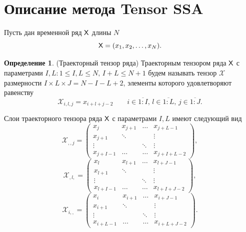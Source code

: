\documentclass[specialist,
    substylefile = spbu_report.rtx,
    subf,href,colorlinks=true, 12pt]{disser}
\theoremstyle{plain}
\theoremstyle{definition}
\newtheorem{definition}{Определение}[section]
\theoremstyle{remark}
\begin{document}
    \section{Описание метода Tensor SSA}\label{sec:Tensor SSA-method-description}
    Пусть дан временной ряд $\mathsf{X}$ длины $N$
    \[
        \mathsf{X}=(x_1,x_2,\ldots,x_N).
    \]
    \begin{definition}(Траекторный тензор ряда)
        Траекторным тензором ряда $\mathsf{X}$ с параметрами $I,L: 1\leqslant I,L \leqslant N,\, I + L \leqslant N + 1$
        будем называть тензор $\mathcal{X}$ размерности $I\times L \times J=N-I-L+2$, элементы которого удовлетворяют равенству
        \[
            \mathcal{X}_{i,l,j}=x_{i+l+j-2}\qquad i\in \overline{1:I},\, l \in\overline{1:L},\, j \in\overline{1:J}.
        \]
    \end{definition}
    Слои траекторного тензора ряда $\mathsf{X}$ с параметрами $I, L$ имеют следующий вид
    \[
        \mathcal{X}_{,,j}=
        \begin{pmatrix}
            x_j       & x_{j+1} & \ldots & x_{j+L-1}   \\
            x_{j+1}   & \ddots  &        & \vdots      \\
            \vdots    &         & \ddots & \vdots      \\
            x_{j+I-1} & \ldots  & \ldots & x_{j+I+L-2}
        \end{pmatrix},\]
    \[
        \mathcal{X}_{,l,}=
        \begin{pmatrix}
            x_l       & x_{l+1} & \ldots & x_{l+J-1}   \\
            x_{l+1}   & \ddots  &        & \vdots      \\
            \vdots    &         & \ddots & \vdots      \\
            x_{l+I-1} & \ldots  & \ldots & x_{l+I+J-2}
        \end{pmatrix},
    \]
    \[
        \mathcal{X}_{i,,}=
        \begin{pmatrix}
            x_i       & x_{i+1} & \ldots & x_{i+J-1}   \\
            x_{i+1}   & \ddots  &        & \vdots      \\
            \vdots    &         & \ddots & \vdots      \\
            x_{i+L-1} & \ldots  & \ldots & x_{i+L+J-2}
        \end{pmatrix}.
    \]
\end{document}
